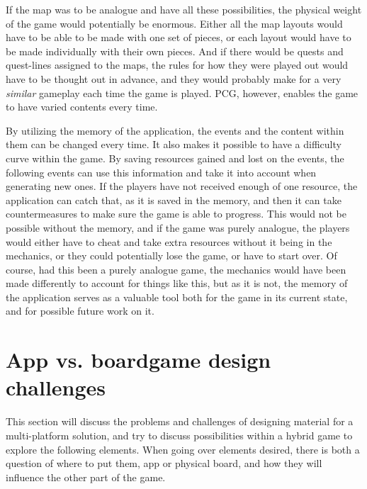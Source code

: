 If the map was to be analogue and have all these possibilities, the physical weight of the game would potentially be enormous. Either all the map layouts would have to be able to be made with one set of pieces, or each layout would have to be made individually with their own pieces. And if there would be quests and quest-lines assigned to the maps, the rules for how they were played out would have to be thought out in advance, and they would probably make for a very \textit{similar} gameplay each time the game is played. PCG, however, enables the game to have varied contents every time.

By utilizing the memory of the application, the events and the content within them can be changed every time. It also makes it possible to have a difficulty curve within the game. By saving resources gained and lost on the events, the following events can use this information and take it into account when generating new ones. If the players have not received enough of one resource, the application can catch that, as it is saved in the memory, and then it can take countermeasures to make sure the game is able to progress. This would not be possible without the memory, and if the game was purely analogue, the players would either have to cheat and take extra resources without it being in the mechanics, or they could potentially lose the game, or have to start over. Of course, had this been a purely analogue game, the mechanics would have been made differently to account for things like this, but as it is not, the memory of the application serves as a valuable tool both for the game in its current state, and for possible future work on it.


\section{App vs. boardgame design challenges}
This section will discuss the problems and challenges of designing material for a multi-platform solution, and try to discuss possibilities within a hybrid game to explore the following elements.
When going over elements desired, there is both a question of where to put them, app or physical board, and how they will influence the other part of the game. 

